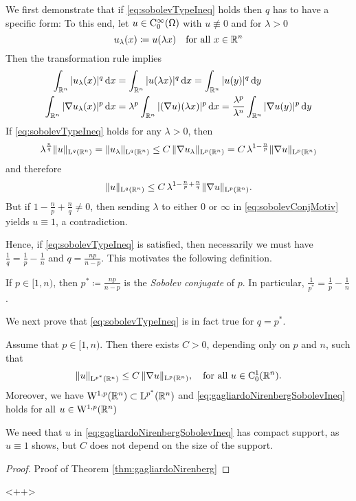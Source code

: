 \begin{motiv}
  We first demonstrate that if \eqref{eq:sobolevTypeIneq} holds then $q$ has to have a specific form:
  To this end, let $u \in \mathrm{C}_0^\infty(\Omega)$ with $u \not\equiv 0$ and for $\lambda > 0$
  $$
  u_\lambda(x) \coloneqq u(\lambda x) \quad\text{for all } x \in \mathbb{R}^n
  $$
  Then the transformation rule implies
  \begin{align*}
    \int_{\mathbb{R}^n} |u_\lambda(x)|^q \, {\operatorname{d}\!{x}} &= \int_{\mathbb{R}^n} |u(\lambda x)|^q \, {\operatorname{d}\!{x}} = \int_{\mathbb{R}^n} |u(y)|^q \, {\operatorname{d}\!{y}} \\
    \int_{\mathbb{R}^n} |\nabla u_\lambda(x) |^p \, {\operatorname{d}\!{x}} &= \lambda^p \int_{\mathbb{R}^n} |(\nabla u)(\lambda x)|^p \, {\operatorname{d}\!{x}} = \frac{\lambda^p}{\lambda^n} \int_{\mathbb{R}^n} |\nabla u(y)|^p \, {\operatorname{d}\!{y}}
  \end{align*}
  If \eqref{eq:sobolevTypeIneq} holds for any $\lambda > 0$, then 
  $$
  \lambda^{\frac{n}{q}} \| u\|_{\mathrm{L}^q(\mathbb{R}^n)}
  = \| u_\lambda\|_{\mathrm{L}^q(\mathbb{R}^n)}
  \leq C \, \|\nabla u_\lambda\|_{\mathrm{L}^p(\mathbb{R}^n)}
  = C \, \lambda^{1 - \frac{n}{p}} \| \nabla u \|_{\mathrm{L}^p(\mathbb{R}^n)}
  $$
  and therefore
  \begin{equation}
    \label{eq:sobolevConjMotiv}
    \|u \|_{\mathrm{L}^q(\mathbb{R}^n)} \leq C \, \lambda^{1 - \frac{n}{p} + \frac{n}{q}} \|\nabla u\|_{\mathrm{L}^p(\mathbb{R}^n)}.
  \end{equation}
  But if $1 - \frac{n}{p} + \frac{n}{q} \neq 0$, then sending $\lambda$ to either $0$ or $\infty$ in \eqref{eq:sobolevConjMotiv} yields $u \equiv 1$, a contradiction.

  Hence, if \eqref{eq:sobolevTypeIneq} is satisfied, then necessarily we must have $\frac{1}{q} = \frac{1}{p} - \frac{1}{n}$ and $q = \frac{n p }{n - p}$.
  This motivates the following definition.
\end{motiv}

\begin{defn}
  If $p \in [1,n)$, then $p^* \coloneqq \frac{np}{n - p}$ is the \emph{Sobolev conjugate} of $p$.
  In particular, $\frac{1}{p^*} = \frac{1}{p} - \frac{1}{n}$.
\end{defn}

We next prove that \eqref{eq:sobolevTypeIneq} is in fact true for $q = p^*$.

\begin{thm}
  \label{thm:gagliardoNirenberg}
  Assume that $p \in [1,n)$.
  Then there exists $C > 0$, depending only on $p$ and $n$, such that
  \begin{equation}
    \label{eq:gagliardoNirenbergSobolevIneq}
    \| u\|_{\mathrm{L}^{p^*}(\mathbb{R}^n)} \leq C \, \|\nabla u\|_{\mathrm{L}^p(\mathbb{R}^n)}, \quad\text{for all } u \in \mathrm{C}_0^1(\mathbb{R}^n).
  \end{equation}
  Moreover, we have $\mathrm{W}^{1,p}(\mathbb{R}^n) \subset \mathrm{L}^{p^*}(\mathbb{R}^n)$ and \eqref{eq:gagliardoNirenbergSobolevIneq} holds for all $u \in \mathrm{W}^{1,p}(\mathbb{R}^n)$
\end{thm}

\begin{rem}
  We need that $u$ in \eqref{eq:gagliardoNirenbergSobolevIneq} has compact support, as $u \equiv 1$ shows, but $C$ does not depend on the size of the support.
\end{rem}

\begin{proof}{Proof of Theorem \ref{thm:gagliardoNirenberg}}
  
\end{proof}<++>

